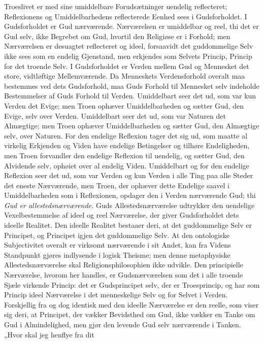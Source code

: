 \documentclass[12pt]{book}
\begin{document}
Troeslivet er med sine umiddelbare Forudsætninger uendelig
reflecteret; Reflexionens og Umiddelbarhedens reflecterede Eenhed
sees i Gudsforholdet. I Gudsforholdet er Gud nærværende.
Nærværelsen er umiddelbar og reel,
thi det er Gud selv, ikke Begrebet om Gud, hvortil den Religiøse er
i Forhold; men Nærværelsen er desuagtet reflecteret og ideel,
forsaavidt det guddommelige Selv ikke sees som en endelig Gjenstand,
men erkjendes som Selvets Princip, Princip for det troende Selv. I
Gudsforholdet er Verden mellem Gud og Mennesket det store,
vidtløftige Mellemværende. Da Menneskets Verdensforhold overalt maa
bestemmes ved dets Gudsforhold, maa Guds Forhold til Mennesket selv
indeholde Bestemmelser af Guds Forhold til Verden. Umiddelbart seer
det ud, som var kun Verden det Evige; men Troen ophæver
Umiddelbarheden og sætter Gud, den Evige, selv over Verden.
Umiddelbart seer det ud, som var Naturen det Almægtige; men Troen
ophæver Umiddelbarheden og sætter Gud, den Almægtige selv, over
Naturen. For den endelige Reflexion tager det sig ud, som maatte al
virkelig Erkjenden og Viden have endelige Betingelser og tilhøre
Endeligheden, men Troen forvandler den endelige Reflexion til
uendelig, og sætter Gud, den Alvidende selv, ophøiet over al endelig
Viden. Umiddelbart og for den endelige Reflexion seer det ud, som
var Verden og kun Verden i alle Ting paa alle Steder det eneste
Nærværende, men Troen, der ophæver dette Endelige saavel i
Umiddelbarheden som i Reflexionen, opdager den i Verden nærværende
Gud; thi \emph{Gud er allestedsnærværende.} Guds
Allestedsnærværelse udtrykker den uendelige Vexelbestemmelse af
ideel og reel Nærværelse, der giver Gudsforholdet dets ideelle
Realitet. Den ideelle Realitet bestaaer deri, at det guddommelige
Selv er Principet, og Principet igjen det guddommelige Selv. At den
ontologiske Subjectivitet overalt er virksomt nærværende i sit
Andet, kan fra Videns Standpunkt gjøres indlysende i logisk Theisme;
men denne metaphysiske Allestedsnærværelse skal
Religionsphilosophien ikke udvikle. Den principielle Nærværelse,
hvorom her handles, er
Gudsnærværelsen som det i alle troende Sjæle virkende Princip: det
er Gudsprincipet selv, der er Troesprincip, og har som Princip ideel
Nærværelse i det menneskelige Selv og for Selvet i Verden.
Forskjellig fra og dog identisk med den ideelle Nærværelse er den
reelle, som viser sig deri, at Principet, der vækker Bevidsthed om
Gud, ikke vækker en Tanke om Gud i Almindelighed, men gjør den
levende Gud selv nærværende i Tanken. „Hvor skal jeg henflye fra dit
\end{document}
